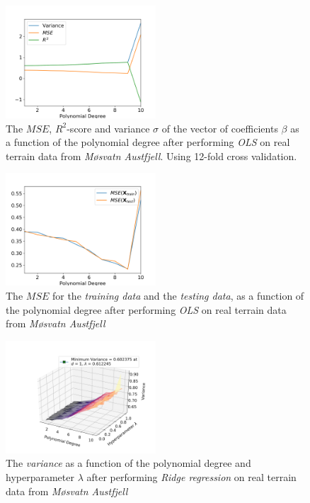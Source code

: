 \documentclass[a4paper,10pt,english]{article}
\begin{document}
\begin{figure}[H]
	\centering 
	\includegraphics[width = 0.5\textwidth, center]{../real_output/part_B.png}
	\caption{The $MSE$, $R^2$-score and variance $\sigma$ of the vector of coefficients $\beta$ as a function of the polynomial degree after performing \textit{OLS} on real terrain data from \textit{Møsvatn Austfjell}. Using 12-fold cross validation.}
	\label{fig_17}
\end{figure}

\begin{figure}[H]
	\centering 
	\includegraphics[width = 0.5\textwidth, center]{../real_output/part_C_2.png}
	\caption{The $MSE$ for the \textit{training data} and the \textit{testing data}, as a function of the polynomial degree after performing \textit{OLS} on real terrain data from \textit{Møsvatn Austfjell}}
	\label{fig_18}
\end{figure}

\begin{figure}[H]
	\centering 
	\includegraphics[width = 0.5\textwidth, center]{../real_output/part_D_1.png}
	\caption{The \textit{variance} as a function of the polynomial degree and hyperparameter $\lambda$ after performing \textit{Ridge regression} on real terrain data from \textit{Møsvatn Austfjell}}
	\label{fig_19}
\end{figure}
\end{document}
